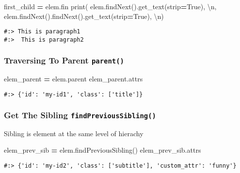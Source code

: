 \documentclass[
]{book}
\newenvironment{Shaded}{\begin{snugshade}}{\end{snugshade}}
\newcommand{\BuiltInTok}[1]{#1}
\newcommand{\CharTok}[1]{\textcolor[rgb]{0.5,0.5,0.5}{#1}}
\newcommand{\NormalTok}[1]{#1}
\newcommand{\OperatorTok}[1]{\textcolor[rgb]{0.43,0.43,0.43}{\textbf{#1}}}
\newcommand{\StringTok}[1]{\textcolor[rgb]{0.5,0.5,0.5}{#1}}
\newcommand{\VariableTok}[1]{\textcolor[rgb]{0,0,0}{#1}}
\begin{document}
\begin{Shaded}
\begin{Highlighting}[]
\NormalTok{first\_child }\OperatorTok{=}\NormalTok{ elem.fin}
\BuiltInTok{print}\NormalTok{( }
\NormalTok{elem.findNext().get\_text(strip}\OperatorTok{=}\VariableTok{True}\NormalTok{), }\StringTok{\textquotesingle{}}\CharTok{\textbackslash{}n}\StringTok{\textquotesingle{}}\NormalTok{, }
\NormalTok{elem.findNext().findNext().get\_text(strip}\OperatorTok{=}\VariableTok{True}\NormalTok{), }\StringTok{\textquotesingle{}}\CharTok{\textbackslash{}n}\StringTok{\textquotesingle{}}\NormalTok{)}
\end{Highlighting}
\end{Shaded}

\begin{verbatim}
#:> This is paragraph1 
#:>  This is paragraph2
\end{verbatim}

\hypertarget{traversing-to-parent-parent}{%
\subsubsection{\texorpdfstring{Traversing To Parent \texttt{parent()}}{Traversing To Parent parent()}}\label{traversing-to-parent-parent}}

\begin{Shaded}
\begin{Highlighting}[]
\NormalTok{elem\_parent }\OperatorTok{=}\NormalTok{ elem.parent}
\NormalTok{elem\_parent.attrs}
\end{Highlighting}
\end{Shaded}

\begin{verbatim}
#:> {'id': 'my-id1', 'class': ['title']}
\end{verbatim}

\hypertarget{get-the-sibling-findprevioussibling}{%
\subsubsection{\texorpdfstring{Get The Sibling \texttt{findPreviousSibling()}}{Get The Sibling findPreviousSibling()}}\label{get-the-sibling-findprevioussibling}}

Sibling is element at the same level of hierachy

\begin{Shaded}
\begin{Highlighting}[]
\NormalTok{elem\_prev\_sib }\OperatorTok{=}\NormalTok{ elem.findPreviousSibling()}
\NormalTok{elem\_prev\_sib.attrs}
\end{Highlighting}
\end{Shaded}

\begin{verbatim}
#:> {'id': 'my-id2', 'class': ['subtitle'], 'custom_attr': 'funny'}
\end{verbatim}

  
\end{document}
